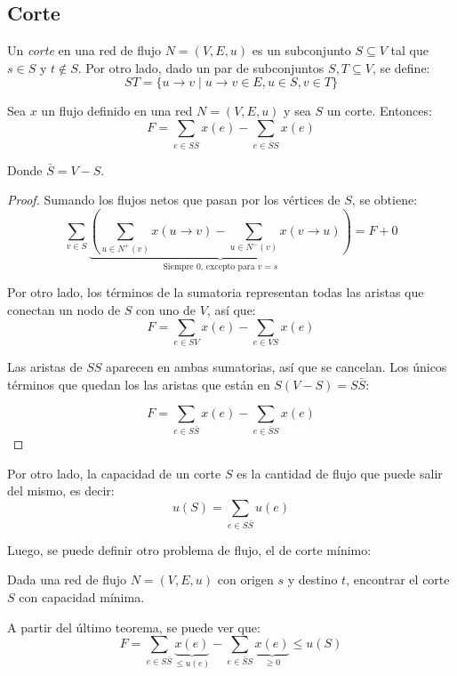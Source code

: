 \subsection{Corte}

Un \textit{corte} en una red de flujo $N = (V, E, u)$ es un subconjunto $S \subseteq V$ tal que $s \in S$ y $t \notin S$. Por otro lado, dado un par de subconjuntos $S, T \subseteq V$, se define:
$$ST = \{u \rightarrow v \mid u \rightarrow v \in E, u \in S, v \in T\}$$

\begin{theorem*}
    \leavevmode

    Sea $x$ un flujo definido en una red $N = (V, E, u)$ y sea $S$ un corte. Entonces:
    $$F = \sum_{e \in S\bar{S}} x(e) - \sum_{e \in \bar{S}S} x(e)$$

    Donde $\bar{S} = V - S$.
\end{theorem*}
\begin{proof}
    Sumando los flujos netos que pasan por los vértices de $S$, se obtiene:
    $$\sum_{v \in S}\underbrace{\left(\sum_{u \in N^+(v)} x(u \rightarrow v) - \sum_{u \in N^-(v)} x(v \rightarrow u)\right)}_{\text{Siempre $0$, excepto para $v = s$}} = F + 0$$

    Por otro lado, los términos de la sumatoria representan todas las aristas que conectan un nodo de $S$ con uno de $V$, así que:
    $$F = \sum_{e \in SV} x(e) - \sum_{e \in VS} x(e)$$

    Las aristas de $SS$ aparecen en ambas sumatorias, así que se cancelan. Los únicos términos que quedan los las aristas que están en $S(V - S) = S\bar{S}$:

    $$F = \sum_{e \in S\bar{S}} x(e) - \sum_{e \in \bar{S}S} x(e)$$

\end{proof}

Por otro lado, la capacidad de un corte $S$ es la cantidad de flujo que puede salir del mismo, es decir:
$$u(S) = \sum_{e \in S\bar{S}} u(e)$$

Luego, se puede definir otro problema de flujo, el de corte mínimo:

\begin{problema}
    Dada una red de flujo $N = (V, E, u)$ con origen $s$ y destino $t$, encontrar el corte $S$ con capacidad mínima.
\end{problema}

A partir del último teorema, se puede ver que:
$$F = \sum_{e \in S\bar{S}} \underbrace{x(e)}_{\leq u(e)} - \sum_{e \in \bar{S}S} \underbrace{x(e)}_{\geq 0} \leq u(S)$$

